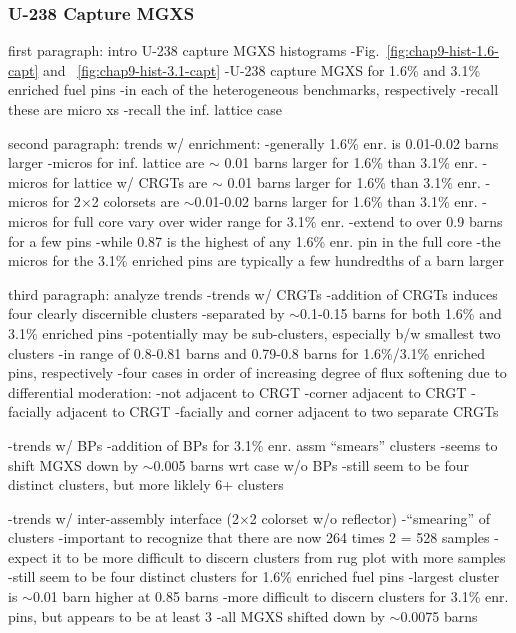\subsubsection{U-238 Capture MGXS}
\label{subsubsec:chap9-histograms-capt}

first paragraph: intro U-238 capture \ac{MGXS} histograms
-Fig.~\ref{fig:chap9-hist-1.6-capt} and ~\ref{fig:chap9-hist-3.1-capt}
  -U-238 capture \ac{MGXS} for 1.6\% and 3.1\% enriched fuel pins
  -in each of the heterogeneous benchmarks, respectively
-recall these are micro xs
-recall the inf. lattice case

second paragraph: trends w/ enrichment:
-generally 1.6\% enr. is 0.01-0.02 barns larger
  -micros for inf. lattice are $\sim$ 0.01 barns larger for 1.6\% than 3.1\% enr.
  -micros for lattice w/ \acp{CRGT} are $\sim$ 0.01 barns larger for 1.6\% than 3.1\% enr.
  -micros for 2$\times$2 colorsets are $\sim$0.01-0.02 barns larger for 1.6\% than 3.1\% enr.
  -micros for full core vary over wider range for 3.1\% enr.
    -extend to over 0.9 barns for a few pins
    -while 0.87 is the highest of any 1.6\% enr. pin in the full core
    -the micros for the 3.1\% enriched pins are typically a few hundredths of a barn larger 

third paragraph: analyze trends
-trends w/ \acp{CRGT}
  -addition of \acp{CRGT} induces four clearly discernible clusters
  -separated by $\sim$0.1-0.15 barns for both 1.6\% and 3.1\% enriched pins
  -potentially may be sub-clusters, especially b/w smallest two clusters
    -in range of 0.8-0.81 barns and 0.79-0.8 barns for 1.6\%/3.1\% enriched pins, respectively
  -four cases in order of increasing degree of flux softening due to differential moderation:
    -not adjacent to \ac{CRGT}
    -corner adjacent to \ac{CRGT}
    -facially adjacent to \ac{CRGT}
    -facially and corner adjacent to two separate \acp{CRGT}

-trends w/ \acp{BP}
  -addition of \acp{BP} for 3.1\% enr. assm ``smears'' clusters
  -seems to shift \ac{MGXS} down by $\sim$0.005 barns wrt case w/o \acp{BP}
  -still seem to be four distinct clusters, but more liklely 6+ clusters
  
-trends w/ inter-assembly interface (2$\times$2 colorset w/o reflector)
  -``smearing'' of clusters
  -important to recognize that there are now 264 times 2 = 528 samples
    -expect it to be more difficult to discern clusters from rug plot with more samples
  -still seem to be four distinct clusters for 1.6\% enriched fuel pins
    -largest cluster is $\sim$0.01 barn higher at 0.85 barns
  -more difficult to discern clusters for 3.1\% enr. pins, but appears to be at least 3
    -all \ac{MGXS} shifted down by $\sim$0.0075 barns 

